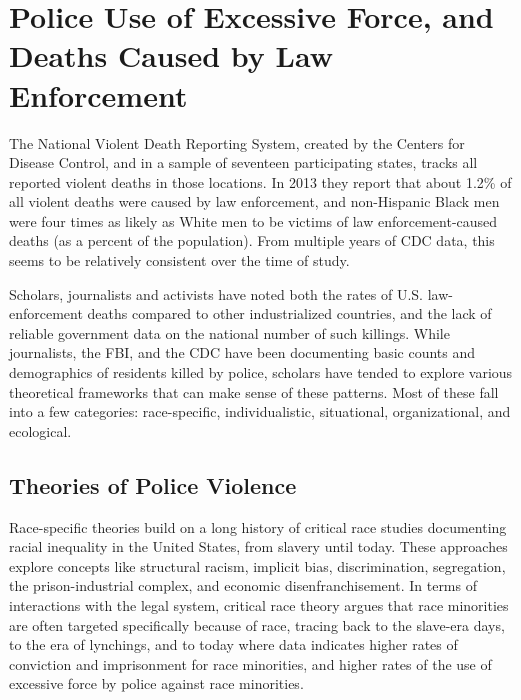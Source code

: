 \documentclass[sigconf]{acmart}
\begin{document}
\section{Police Use of Excessive Force, and Deaths Caused by Law Enforcement}
The National Violent Death Reporting System, created by the Centers for Disease Control, and  in a sample of seventeen participating states, tracks all reported violent deaths in those locations.  In 2013 they report that about 1.2\% of all violent deaths were caused by law enforcement, and non-Hispanic Black men were four times as likely as White men to be victims of law enforcement-caused deaths (as a percent of the population). \cite{cdc13}  From multiple years of CDC data, this seems to be relatively consistent over the time of study.  

Scholars, journalists and activists have noted both the rates of U.S. law-enforcement deaths compared to other industrialized countries, and the lack of reliable government data on the national number of such killings. \cite{currie16,pridemore05,dalton17,lartey15,ser16}  While journalists, the FBI, and the CDC have been documenting basic counts and demographics of residents killed by police, scholars have tended to explore various theoretical frameworks that can make sense of these patterns.  Most of these fall into a few categories: race-specific, individualistic, situational, organizational, and ecological. \cite{nix17,provine11,smith14,chaney13}

\subsection{Theories of Police Violence}
Race-specific theories build on a long history of critical race studies documenting racial inequality in the United States, from slavery until today. \cite{provine11,chaney13,meeks06,crichlow14,payne17}  These approaches explore concepts like structural racism, implicit bias, discrimination, segregation, the prison-industrial complex, and economic disenfranchisement.  In terms of interactions with the legal system, critical race theory argues that race minorities are often targeted specifically because of race, tracing back to the slave-era days, to the era of lynchings, and to today where data indicates higher rates of conviction and imprisonment for race minorities, and higher rates of the use of excessive force by police against race minorities.  \cite{payne17,provine11,meeks06,chaney13,crichlow14,petro03}  
\end{document}
